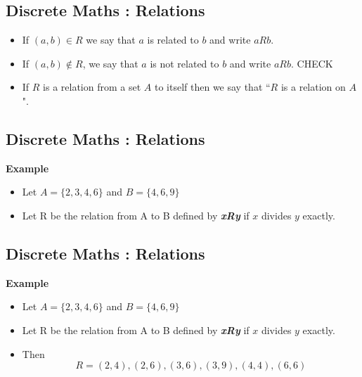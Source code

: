 \documentclass[]{report}
\begin{document}
\begin{enumerate}

\subsection{Discrete Maths : Relations}

\begin{itemize}

\item  If $(a, b) \in R$ we say that $a$ is related to $b$ and write $aRb$.
\item If $(a, b) \notin R$, we say that $a$ is not related to $b$ and write $aRb$. CHECK
\item If
$R$ is a relation from a set $A$ to itself then we say that ``$R$ is a relation
on $A$".
\end{itemize}


\subsection{Discrete Maths : Relations}

\textbf{Example}
\begin{itemize}
\item Let $A = \{2, 3, 4, 6\}$ and $B = \{4, 6, 9\}$
\item Let R be the relation from A to B defined by \textit{\textbf{xRy}} if $x$
divides $y$ exactly.
\end{itemize}



\subsection{Discrete Maths : Relations}

\textbf{Example}
\begin{itemize}

\item Let $A = \{2, 3, 4, 6\}$ and $B = \{4, 6, 9\}$
\item Let R be the relation from A to B defined by \textit{\textbf{xRy}} if $x$
divides $y$ exactly.
\item  Then
\[R = {(2, 4), (2, 6), (3, 6), (3, 9), (4, 4), (6, 6)}\]
\end{itemize}




\end{enumerate}
\end{document}
